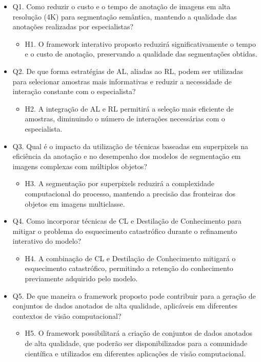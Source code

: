 \begin{itemize}
\item Q1. Como reduzir o custo e o tempo de anotação de imagens em alta resolução (4K) para segmentação semântica, mantendo a qualidade das anotações realizadas por especialistas?

\begin{itemize}
\item H1. O framework interativo proposto reduzirá significativamente o tempo e o custo de anotação, preservando a qualidade das segmentações obtidas.
\end{itemize}

\item Q2. De que forma estratégias de \ac{AL}, aliadas
ao \ac{RL}, podem ser utilizadas para selecionar amostras mais informativas e reduzir a necessidade de interação constante com o especialista?

\begin{itemize}
\item H2. A integração de \ac{AL} e \ac{RL} permitirá a seleção mais eficiente de amostras, diminuindo o número de interações necessárias com o especialista.
\end{itemize}

\item Q3. Qual é o impacto da utilização de técnicas baseadas em superpixels na eficiência da anotação e no desempenho dos modelos de segmentação em imagens complexas com múltiplos objetos?

\begin{itemize}
\item H3. A segmentação por superpixels reduzirá a complexidade computacional do processo, mantendo a precisão das fronteiras dos objetos em imagens multiclasse.
\end{itemize}

\item Q4. Como incorporar técnicas de \ac{CL} e Destilação de Conhecimento para mitigar o problema do esquecimento catastrófico durante o refinamento interativo do modelo?

\begin{itemize}
\item H4. A combinação de \ac{CL} e Destilação de Conhecimento mitigará o esquecimento catastrófico, permitindo a retenção do conhecimento previamente adquirido pelo modelo.
\end{itemize}

\item Q5. De que maneira o framework proposto pode contribuir para a geração de conjuntos de dados anotados de alta qualidade, aplicáveis em diferentes contextos de visão computacional?

\begin{itemize}
\item H5. O framework possibilitará a criação de conjuntos de dados anotados de alta qualidade, que poderão ser disponibilizados para a comunidade científica e utilizados em diferentes aplicações de visão computacional.
\end{itemize}

\end{itemize}

